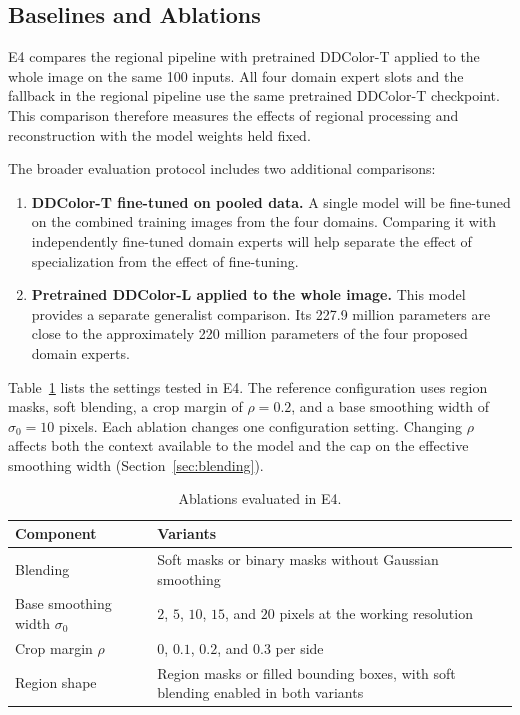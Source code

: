 \documentclass{FastFyp}
\begin{document}
\subsection{Baselines and Ablations}

E4 compares the regional pipeline with pretrained DDColor-T applied to
the whole image on the same 100 inputs. All four domain expert slots and
the fallback in the regional pipeline use the same pretrained DDColor-T
checkpoint. This comparison therefore measures the effects of regional
processing and reconstruction with the model weights held fixed.

The broader evaluation protocol includes two additional comparisons:

\begin{enumerate}
    \item \textbf{DDColor-T fine-tuned on pooled data.} A single model
          will be fine-tuned on the combined training images from the
          four domains. Comparing it with independently fine-tuned
          domain experts will help separate the effect of specialization
          from the effect of fine-tuning.

    \item \textbf{Pretrained DDColor-L applied to the whole image.}
          This model provides a separate generalist comparison. Its
          227.9 million parameters are close to the approximately
          220 million parameters of the four proposed domain experts.
\end{enumerate}

Table~\ref{tab:ablations} lists the settings tested in E4. The reference
configuration uses region masks, soft blending, a crop margin of
$\rho=0.2$, and a base smoothing width of $\sigma_0=10$ pixels.
Each ablation changes one configuration setting. Changing $\rho$
affects both the context available to the model and the cap on the
effective smoothing width (Section~\ref{sec:blending}).

\begin{table}[htbp]
    \centering
    \caption{Ablations evaluated in E4.}
    \label{tab:ablations}
    \begin{tabular}{p{4.0cm}p{8.5cm}}
        \hline
        \textbf{Component} & \textbf{Variants} \\
        \hline
        Blending &
        Soft masks or binary masks without Gaussian smoothing \\

        Base smoothing width $\sigma_0$ &
        $2$, $5$, $10$, $15$, and $20$ pixels at the working resolution \\

        Crop margin $\rho$ &
        $0$, $0.1$, $0.2$, and $0.3$ per side \\

        Region shape &
        Region masks or filled bounding boxes, with soft blending
        enabled in both variants \\
        \hline
    \end{tabular}
\end{table}
\end{document}

